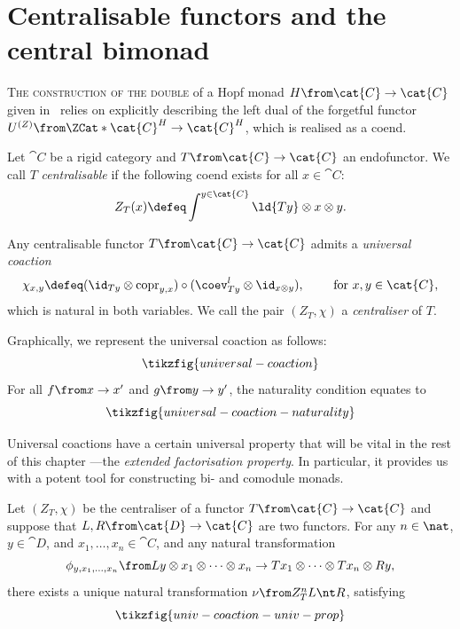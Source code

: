 \section{Centralisable functors and the central bimonad}\label{section: centralisable_functors_and_the_central_bimonad}

\textsc{The construction of the double} of a Hopf monad \(H\from \cat{C} \to \cat{C}\) given in~\cite{Bruguieres2012} relies on
explicitly describing the left dual of the forgetful functor \(U^{(Z)} \from \ZCat*{\cat{C}^H} \to \cat{C}^H\),
which is realised as a coend.

\begin{definition}\label{def:centraliser}
  Let \(\cat{C}\) be a rigid category and \(T \from \cat{C} \to \cat{C}\) an endofunctor.
  We call \(T\) \emph{centralisable} if the following coend exists for all \(x \in \cat{C}\):
  \[
    Z_T(x) \defeq \int^{y \in \cat{C}} \ld{Ty} \otimes x \otimes y.
  \]
\end{definition}

\begin{remark}\label{rmk:universal-coaction}
  Any centralisable functor \(T \from \cat{C} \to \cat{C}\) admits a \emph{universal coaction}
  \[
    \chi_{x,y} \defeq (\id_{Ty} \otimes \mathrm{copr}_{y,x}) \circ (\coev^l_{Ty} \otimes \id_{x \otimes y}),
    \qquad \text{ for } x, y \in \cat{C},
  \]
  which is natural in both variables.
  We call the pair \((Z_T, \chi)\) a \emph{centraliser} of \(T\).
\end{remark}

\begin{remark}\label{rmk:universal-coaction-graphically}
  Graphically, we represent the universal coaction as follows:
  \[
    \tikzfig{universal-coaction}
  \]
  For all \(f\from x\to x'\) and \(g\from y\to y'\), the naturality condition equates to
  \[
    \tikzfig{universal-coaction-naturality}
  \]
\end{remark}

Universal coactions have a certain universal property that will be vital in the rest of this chapter%
—the \emph{extended factorisation property}.
In particular, it provides us with a potent tool for constructing bi- and comodule monads.

\begin{lemma}\label{lem: extended_factorisation_property}
  Let \((Z_T, \chi)\) be the centraliser of a functor \(T \from \cat{C} \to \cat{C}\)
  and suppose that \(L, R \from \cat{D} \to \cat{C}\) are two functors.
  For any \(n \in \nat\), \(y \in \cat{D}\), and \(x_1, \dots, x_n \in \cat{C}\), and any natural transformation
  \[
    \phi_{y, x_1, \dots, x_n}\from Ly \otimes  x_1 \otimes \dots \otimes x_n \to Tx_1 \otimes \dots \otimes Tx_n \otimes Ry,
  \]
  there exists a unique natural transformation \(\nu \from Z_T^n L \nt R\), satisfying
  \[
    \tikzfig{univ-coaction-univ-prop}
  \]
\end{lemma}

